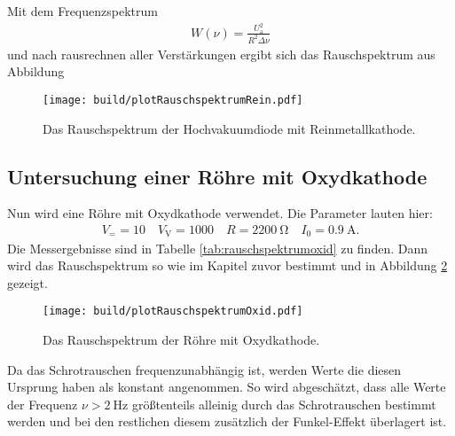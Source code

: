 Mit dem Frequenzspektrum
\begin{align}
  W(\nu) = \frac{U_\text{a}^2}{R^2 \Delta \nu}
\end{align}
und nach rausrechnen aller Verstärkungen ergibt sich das Rauschspektrum aus Abbildung
\begin{figure}
  \centering
  \texttt{[image: build/plotRauschspektrumRein.pdf]}
  \caption{Das Rauschspektrum der Hochvakuumdiode mit Reinmetallkathode.}
  \label{fig:plotRauschspektrumRein}
\end{figure}

\subsection{Untersuchung einer Röhre mit Oxydkathode}

Nun wird eine Röhre mit Oxydkathode verwendet.
Die Parameter lauten hier:
\begin{align*}
  V_= = 10 \quad V_\text{V} = 1000 \quad R = \SI{2200}{\ohm} \quad I_0 = \SI{0.9}{\ampere}.
\end{align*}
Die Messergebnisse sind in Tabelle \ref{tab:rauschspektrumoxid} zu finden. Dann wird das Rauschspektrum so wie im Kapitel zuvor bestimmt und in Abbildung \ref{fig:plotRauschspektrumOxid} gezeigt.
\begin{figure}
  \centering
  \texttt{[image: build/plotRauschspektrumOxid.pdf]}
  \caption{Das Rauschspektrum der Röhre mit Oxydkathode.}
  \label{fig:plotRauschspektrumOxid}
\end{figure}
Da das Schrotrauschen frequenzunabhängig ist, werden Werte die diesen Ursprung haben als konstant angenommen. So wird abgeschätzt, dass alle Werte der Frequenz $\nu > \SI{2}{\hertz}$
größtenteils alleinig durch das Schrotrauschen bestimmt werden und bei den restlichen diesem zusätzlich der Funkel-Effekt überlagert ist.

